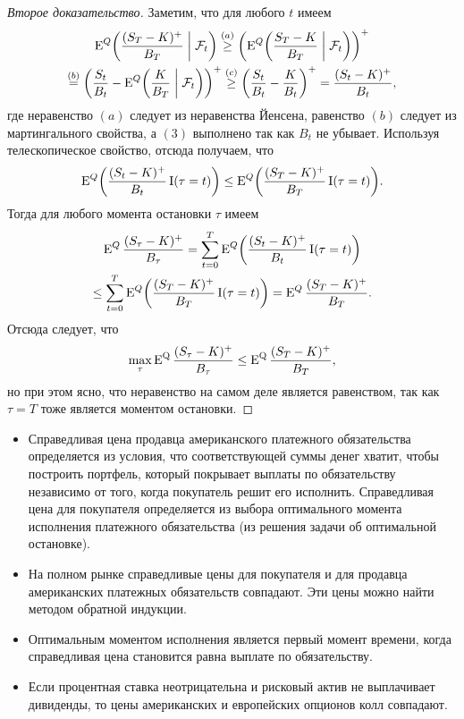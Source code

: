 \begin{proof}[Второе доказательство]
Заметим, что для любого $t$ имеем
\begin{multline*}
\operatorname{E}^Q \biggl(\frac{(S_T-K)^+}{B_T} \;\bigg|\; \mathcal{F}_t\biggr) \stackrel{(a)}{\ge}
\biggl(\operatorname{E}^Q \biggl(\frac{S_T-K}{B_T} \;\bigg|\; \mathcal{F}_t\biggr)\biggr)^+ \\ \stackrel{(b)}{=}
\biggl(\frac{S_t}{B_t} - \operatorname{E}^Q\biggl(\frac{K}{B_T}\;\bigg|\; \mathcal{F}_t
\biggr)\biggr)^+ \stackrel{(c)}{\ge}
\biggl(\frac{S_t}{B_t} - \frac{K}{B_t}\biggr)^+ = \frac{(S_t-K)^+}{B_t},
\end{multline*}
где неравенство $(a)$ следует из неравенства Йенсена, равенство $(b)$ следует из мартингального свойства, а $(3)$ выполнено так как $B_t$ не убывает.
Используя телескопическое свойство, отсюда получаем, что
\[
\operatorname{E}^Q \biggl(\frac{(S_t-K)^+}{B_t} \operatorname{I}(\tau=t)\biggr) \le
\operatorname{E}^Q \biggl(\frac{(S_T-K)^+}{B_T} \operatorname{I}(\tau=t)\biggr).
\]
Тогда для любого момента остановки $\tau$ имеем
\begin{multline*}
\operatorname{E}^Q \frac{(S_\tau-K)^+}{B_\tau}
= \sum_{t=0}^T \operatorname{E}^Q \biggl(\frac{(S_t-K)^+}{B_t}\operatorname{I}(\tau=t)\biggr) \\
\le \sum_{t=0}^T \operatorname{E}^Q \biggl(\frac{(S_T-K)^+}{B_T}\operatorname{I}(\tau=t)\biggr)
= \operatorname{E}^Q \frac{(S_T-K)^+}{B_T}.
\end{multline*}
Отсюда следует, что
\[
\max_{\tau} \operatorname{E}^{\mathrm{Q}} \frac{(S_\tau - K)^+}{B_\tau} \le \operatorname{E}^{\mathrm{Q}} \frac{(S_T - K)^+}{B_T},
\]
но при этом ясно, что неравенство на самом деле является равенством, так как $\tau=T$ тоже является моментом остановки.
\end{proof}


\summary

\begin{itemize}
\item Справедливая цена продавца американского платежного обязательства определяется из условия, что соответствующей суммы денег хватит, чтобы построить портфель, который покрывает выплаты по обязательству независимо от того, когда покупатель решит его исполнить.
Справедливая цена для покупателя определяется из выбора оптимального момента исполнения платежного обязательства (из решения задачи об оптимальной остановке).

\item На полном рынке справедливые цены для покупателя и для продавца американских платежных обязательств совпадают.
Эти цены можно найти методом обратной индукции. 

\item Оптимальным моментом исполнения является первый момент времени, когда справедливая цена становится равна выплате по обязательству.

\item Если процентная ставка неотрицательна и рисковый актив не выплачивает дивиденды, то цены американских и европейских опционов колл совпадают.
\end{itemize}
